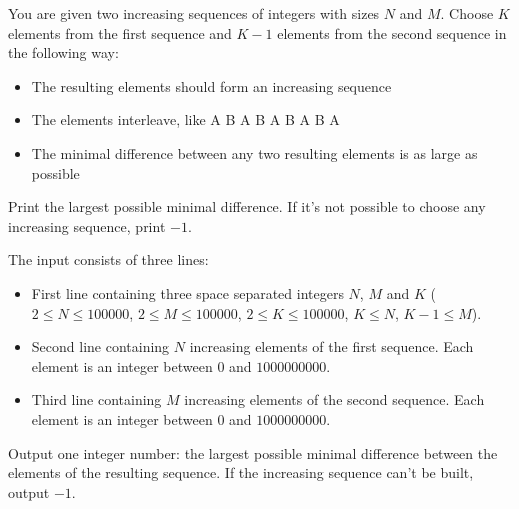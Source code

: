 \problemname{\problemyamlname}


\newcommand{\minn}{2}
\newcommand{\maxn}{100000}
\newcommand{\minm}{2}
\newcommand{\maxm}{100000}
\newcommand{\mink}{2}
\newcommand{\maxk}{100000}
\newcommand{\mina}{0}
\newcommand{\maxa}{1000000000}

You are given two increasing sequences of integers with sizes $N$ and $M$. Choose $K$ elements from the first sequence and $K-1$ elements from the second sequence in the following way:
\begin{itemize}
    \item The resulting elements should form an increasing sequence
    \item The elements interleave, like A B A B A B A B A
    \item The minimal difference between any two resulting elements is as large as possible
\end{itemize}

Print the largest possible minimal difference. If it's not possible to choose any increasing sequence, print $-1$.

\begin{Input}
    The input consists of three lines:
    \begin{itemize}
        \item First line containing three space separated integers $N$, $M$ and $K$ ($\minn \leq N\leq \maxn$, $\minm \leq M\leq \maxm$, $\mink \leq K\leq \maxk$, $K \leq N$, $K-1 \leq M$).
        \item Second line containing $N$ increasing elements of the first sequence. Each element is an integer between $\mina$ and $\maxa$.
        \item Third line containing $M$ increasing elements of the second sequence. Each element is an integer between $\mina$ and $\maxa$.
    \end{itemize}
\end{Input}

\begin{Output}
    Output one integer number: the largest possible minimal difference between the elements of the resulting sequence. If the increasing sequence can't be built, output $-1$.
\end{Output}
